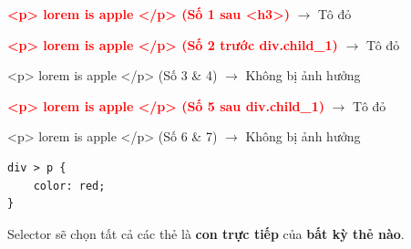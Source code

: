 \begin{browserWindow}
\sffamily\small
\begin{tcolorbox}[arc=2pt, colback=primaryBlue!5, colframe=primaryBlue!40, boxrule=1pt, title={\sffamily\small\color{white}\textbf{.Parent}}, colbacktitle=primaryBlue!70]
\textcolor{red}{\textbf{<p> lorem is apple </p> (Số 1 sau <h3>)}} $\rightarrow$ Tô đỏ \par\vspace{2pt}
\textcolor{red}{\textbf{<p> lorem is apple </p> (Số 2 trước div.child\_1)}} $\rightarrow$ Tô đỏ \par\vspace{3pt}
\begin{tcolorbox}[arc=2pt, colback=white, colframe=gray!30, boxrule=1pt, title={\sffamily\scriptsize\color{darkText}.child\_1}]
<p> lorem is apple </p> (Số 3 \& 4) $\rightarrow$ Không bị ảnh hưởng
\end{tcolorbox}\vspace{3pt}
\textcolor{red}{\textbf{<p> lorem is apple </p> (Số 5 sau div.child\_1)}} $\rightarrow$ Tô đỏ \par\vspace{3pt}
\begin{tcolorbox}[arc=2pt, colback=white, colframe=gray!30, boxrule=1pt, title={\sffamily\scriptsize\color{darkText}.child\_2}]
<p> lorem is apple </p> (Số 6 \& 7) $\rightarrow$ Không bị ảnh hưởng
\end{tcolorbox}
\end{tcolorbox}
\end{browserWindow}

\begin{codeWindow}
\begin{lstlisting}[language=CSS3]
div > p {
    color: red;
}
\end{lstlisting}
\end{codeWindow}

\begin{conceptBox}
Selector  sẽ chọn tất cả các thẻ  là \textbf{con trực tiếp} của \textbf{bất kỳ thẻ  nào}.
\end{conceptBox}


